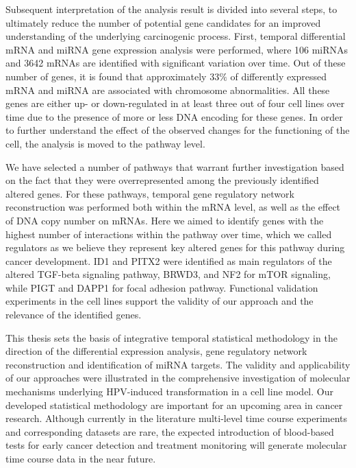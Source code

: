 \begin{summary}
Subsequent interpretation of the analysis result is divided into several steps, to ultimately reduce the number of potential gene candidates for an improved understanding of the underlying carcinogenic process. First, temporal differential mRNA and miRNA gene expression analysis were performed, where 106 miRNAs and 3642 mRNAs are identified with significant variation over time. Out of these number of genes, it is found that approximately 33$\%$ of differently expressed mRNA and miRNA are associated with chromosome abnormalities. All these genes are either up- or down-regulated in at least three out of four cell lines over time due to the presence of more or less DNA encoding for these genes. In order to further understand the effect of the observed changes for the functioning of the cell, the analysis is moved to the pathway level. 

We have selected  a number of  pathways that warrant further investigation based on the fact that they were overrepresented among the previously identified altered genes. For these pathways, temporal gene regulatory network reconstruction was performed both within the mRNA level, as well as the effect of DNA copy number on mRNAs. Here we aimed to identify genes with the highest number of interactions within the pathway over time, which we called regulators as we believe they represent key altered genes for this pathway during cancer development. ID1 and PITX2 were identified as main regulators of the altered TGF-beta signaling pathway, BRWD3, and NF2 for mTOR signaling, while PIGT and DAPP1 for focal adhesion pathway. Functional validation experiments in the cell lines support the validity of our approach and the relevance of the identified genes.

This thesis sets the basis of integrative temporal statistical methodology in the direction of the differential expression analysis, gene regulatory network reconstruction and identification of miRNA targets. The validity and applicability of our approaches were illustrated in the comprehensive investigation of molecular mechanisms underlying HPV-induced transformation in a cell line model. Our developed statistical methodology are important for an upcoming area in cancer research. Although currently in the literature multi-level time course experiments and corresponding datasets are rare, the expected introduction of blood-based tests for early cancer detection and treatment monitoring will generate molecular time course data in the near future. %

\end{summary}

